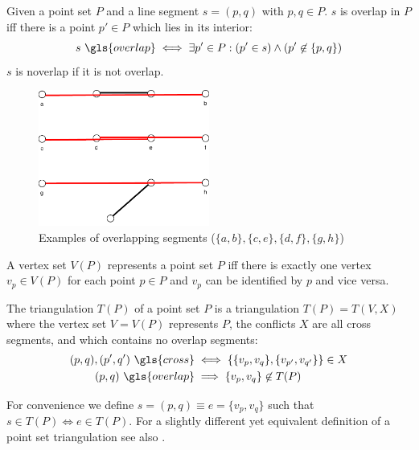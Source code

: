 \begin{definition}
  \label{def:overlapping_segments}
  Given a point set \(P\) and a line segment \(s = (p,q)\) with
  \(p,q \in P\). \(s\) is \gls{overlap} in \(P\) iff there is a point
  \(p' \in P\) which lies in its interior:
  \[
    s~\gls{overlap}
    \iff  \exists p' \in P : (p' \in s) \land (p' \not\in \{p,q\})
  \]
  \(s\) is \gls{noverlap} if it is not \gls{overlap}.
\end{definition}

\begin{figure}[ht]
  \centering
  \includegraphics[width=0.5\textwidth]{img/example_overlapping.pdf}
  \caption{Examples of overlapping segments (\(\{a,b\}, \{c,e\}, \{d,f\}, \{g,h\}\))}
\end{figure}


\begin{definition}
  A vertex set \(V(P)\) represents a point set \(P\) iff there
  is exactly one vertex \(v_p \in V(P)\) for each point \(p \in P\)
  and \(v_p\) can be identified by \(p\) and vice versa.
%   
\end{definition}

\begin{definition}
  \label{def:point_set_triangulation}
  The triangulation \(T(P)\) of a point set \(P\) is a triangulation
  \(T(P) = T(V,X)\) where the vertex set
  \(V=V(P)\) represents \(P\), the conflicts \(X\) are all
  \gls{cross} segments, and which contains no \gls{overlap} segments:
  \begin{alignat*}{1}
    (p,q), (p',q')~\gls{cross}
    &\iff \left\{ \{v_p,v_q\}, \{v_{p'},v_{q'}\} \right\} \in X \\
     (p,q)~\gls{overlap}
    &\implies \{v_p,v_q\} \not\in T(P)
  \end{alignat*}

  For convenience we define \(s=(p,q) \equiv e=\{v_p,v_q\}\) such
  that \(s \in T(P) \iff e \in T(P)\). For a slightly different yet
  equivalent definition of a point set triangulation see also
  \cite[Section 9.1]{deberg_compgeom}.
\end{definition}

